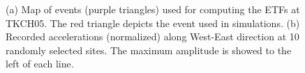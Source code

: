 \clearpage
{}
\begin{figure}[!ht]
   \hfil
  \caption{(a) Map of events (purple triangles) used for computing the ETFs at TKCH05. The red triangle depicts the event used in simulations. (b) Recorded accelerations (normalized) along West-East direction at 10 randomly selected sites. The maximum amplitude is showed to the left of each line.}
  \label{fig:etf-S2}
\end{figure}


